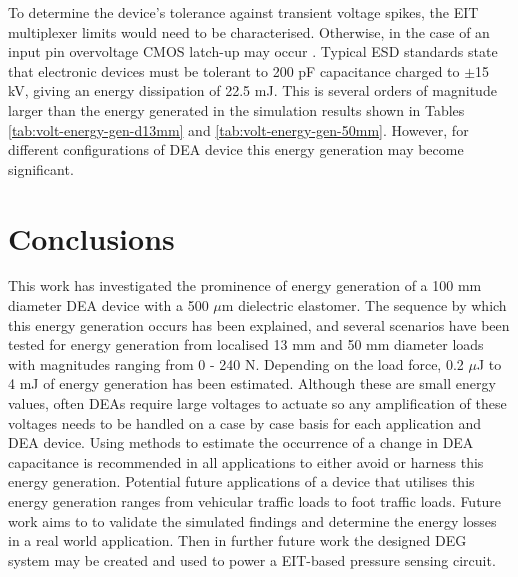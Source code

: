 To determine the device's tolerance against transient voltage spikes, the EIT multiplexer limits would need to be characterised. Otherwise, in the case of an input pin overvoltage CMOS latch-up may occur \cite{Redmond2001} . Typical ESD standards \cite{IEC2008} state that electronic devices must be tolerant to 200 pF capacitance charged to $\pm$15 kV, giving an energy dissipation of 22.5 mJ. This is several orders of magnitude larger than the energy generated in the simulation results shown in Tables \ref{tab:volt-energy-gen-d13mm} and \ref{tab:volt-energy-gen-50mm}. However, for different configurations of DEA device this energy generation may become significant.




\section{Conclusions}

This work has investigated the prominence of energy generation of a 100 mm diameter DEA device with a 500 $\mu$m dielectric elastomer. The sequence by which this energy generation occurs has been explained, and several scenarios have been tested for energy generation from localised 13 mm and 50 mm diameter loads with magnitudes ranging from 0 - 240 N. Depending on the load force, 0.2 $\mu$J to 4 mJ of energy generation has been estimated. Although these are small energy values, often DEAs require large voltages to actuate so any amplification of these voltages needs to be handled on a case by case basis for each application and DEA device. Using methods to estimate the occurrence of a change in DEA capacitance is recommended in all applications to either avoid or harness this energy generation. Potential future applications of a device that utilises this energy generation ranges from vehicular traffic loads to foot traffic loads. Future work aims to to validate the simulated findings and determine the energy losses in a real world application. Then in further future work the designed DEG system may be created and used to power a EIT-based pressure sensing circuit. 

